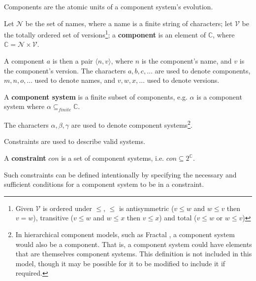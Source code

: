 Components are the atomic units of a component system's evolution.
\begin{defs}
\label{formal.componentdef}
Let $\mathcal{N}$ be the set of names, where a name is a finite string of characters; 
let $\mathcal{V}$ be the totally ordered set of versions\footnote{Given $\mathcal{V}$ is ordered under 
$\leq$, $\leq$ is antisymmetric ($v \leq w$ and $w \leq v$ then $v = w$), transitive ($v \leq w$ and $w \leq x$ then $v \leq x$) and total ($v \leq w$ or $w \leq v$)}; 
a \textbf{component}
is an element of $\mathbb{C}$, where $\mathbb{C} = \mathcal{N} \times \mathcal{V}$.
\end{defs}
A component $a$ is then a pair $\langle n,v \rangle$, where $n$ is the component's name, and $v$ is the component's version.
The characters  $a,b,c,\ldots$ are used to denote components, $m,n,o,\ldots$ used to denote names, and $v,w,x,\ldots$ used to denote versions.

\begin{defs}
\label{formal.componentsystemdef}
A \textbf{component system} is a finite subset of components, e.g. $\alpha$ is a component system where $\alpha \subseteq_{finite} \mathbb{C}$. 
\end{defs}
The characters $\alpha,\beta,\gamma$ are used to denote component systems\footnote{In hierarchical component models, such as Fractal \citep{Quma2006}, 
a component system would also be a component.
That is, a component system could have elements that are themselves component systems.
This definition is not included in this model, though it may be possible for it to be modified to include it if required.}.

Constraints are used to describe valid systems.
\begin{defs}
\label{formal.constraintdefs}
A \textbf{constraint} $con$ is a set of component systems, i.e. $con \subseteq 2^{\mathbb{C}}$.
\end{defs}
Such constraints can be defined intentionally by specifying the necessary and sufficient conditions for a component system to be in a constraint.

